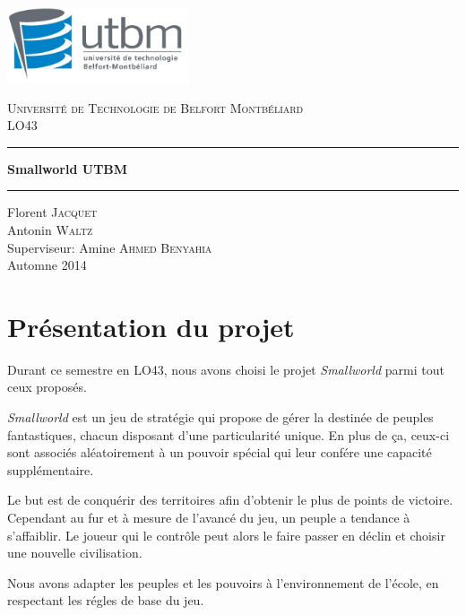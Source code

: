 \documentclass[a4paper]{report}
\begin{document}
\begin{titlepage}
    \includegraphics[width=0.4\textwidth]{logo_utbm.png}
    \begin{center}
        \textsc{\LARGE Université de Technologie de Belfort Montbéliard}\\[1cm]
        \textsc{\Large LO43}\\
        \rule{\linewidth}{0.5mm}
        { \huge \bfseries Smallworld UTBM\\[0.4cm] }
        \rule{\linewidth}{0.5mm}
        \vskip1cm
        Florent \textsc{Jacquet}\\
        Antonin \textsc{Waltz}\\
        Superviseur: Amine \textsc{Ahmed Benyahia}\\
        \vskip1cm
        \vfill
        {\large Automne 2014}
    \end{center}
\end{titlepage}


\newpage
\tableofcontents
\listoffigures

\newpage
\chapter{Présentation du projet}
\par
Durant ce semestre en LO43, nous avons choisi le projet \textit{Smallworld}
parmi tout ceux proposés.
\par
\textit{Smallworld} est un jeu de stratégie qui propose de gérer la destinée de
peuples fantastiques, chacun disposant d'une particularité unique. En plus de
ça, ceux-ci sont associés aléatoirement à un pouvoir spécial qui leur confére
une capacité supplémentaire.
\par
Le but est de conquérir des territoires afin d'obtenir le plus de points de
victoire. Cependant au fur et à mesure de l'avancé du jeu, un peuple a tendance
à s'affaiblir.  Le joueur qui le contrôle peut alors le faire passer en déclin
et choisir une nouvelle civilisation.
\par
Nous avons adapter les peuples et les pouvoirs à l'environnement de l'école, en
respectant les régles de base du jeu.
\end{document}

